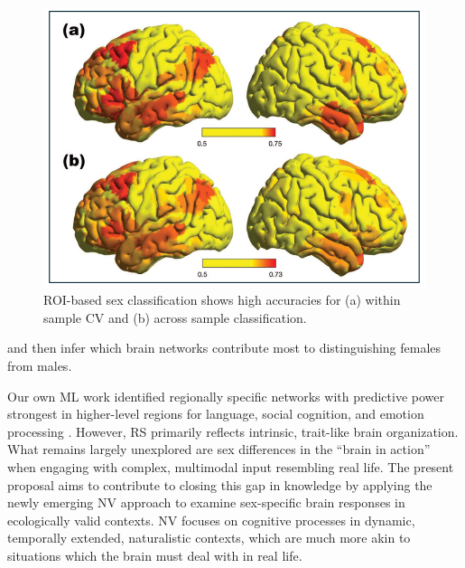 \documentclass[11pt,a4paper]{article}
\begin{document}
\begin{figure} %
  \vspace{-10pt} %
  \includegraphics[width=\linewidth]{sex_classification.png}
  \caption{ROI-based sex classification shows high accuracies for (a) within sample CV and (b) across sample classification.}
  \label{fig:sexclass}
\end{figure}
and then infer which brain networks contribute most to distinguishing females from males.
\par\vspace{-1\parskip}\noindent
Our own ML work identified regionally specific networks with predictive power strongest in higher-level regions 
for language, social cognition, and emotion processing 
\parencite{weisSexClassificationResting2020a,wierschAccurateSexPrediction2023a,wierschSexDifferencesBrain2021a}.
However, RS primarily reflects intrinsic, trait-like brain organization. \\
What remains largely unexplored are 
sex differences in the “brain in action” when engaging with complex, multimodal input resembling real life. 
The present proposal aims to contribute to closing this gap in knowledge by applying the newly 
emerging NV approach to examine sex-specific brain responses in ecologically valid contexts. 
NV focuses on 
cognitive processes in dynamic, temporally extended, naturalistic contexts, which are much more akin to
situations which the brain must deal with in real life.
\par\vspace{-1\parskip}\noindent %
\end{document}
